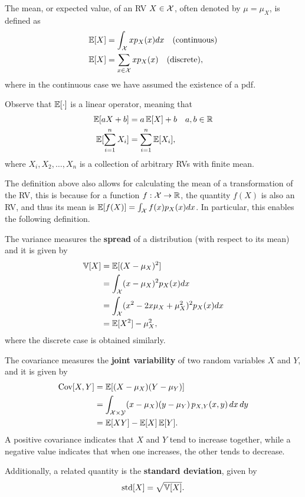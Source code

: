 \begin{definition}[Mean] 
\label{def:mean}
The mean, or expected value, of an RV $X\in{\mathcal X}$, often denoted by $\mu = \mu_X$, is defined as
\begin{align}
	\operatorname{\mathbb{E}}[X] &= \int_{\mathcal X} xp_X(x)dx\quad\text{(continuous)}\\
	\operatorname{\mathbb{E}}[X] &= \sum_{x\in{\mathcal X}} xp_X(x)\quad\text{(discrete)},\\
\end{align}
 where in the continuous case we have assumed the existence of a pdf. 
\end{definition}
Observe that $\operatorname{\mathbb{E}}[\cdot]$ is a linear operator, meaning that 
 \begin{align}
	\operatorname{\mathbb{E}}[aX + b] &= a\operatorname{\mathbb{E}}[X] + b\quad a,b\in\mathbb{R}\\
	\operatorname{\mathbb{E}}[\sum_{i=1}^n X_i] &= \sum_{i=1}^n \operatorname{\mathbb{E}}[ X_i], \\
\end{align}
where $X_i,X_2,\ldots, X_n$ is a collection of arbitrary RVs with finite mean. 

The definition above also allows for calculating the mean of a transformation of the RV, this is because for a function $f:{\mathcal X} \to \mathbb{R}$, the quantity $f(X)$ is also an RV, and thus its mean is $\operatorname{\mathbb{E}}[f(X)] = \int_{\mathcal X} f(x)p_X(x)dx$. In particular, this enables the following definition.


\begin{definition}[Variance] 
\label{def:variance}
The variance measures the \textbf{spread} of a distribution (with respect to its mean) and it is given by
\begin{align}
	\operatorname{\mathbb{V}}[X] &= \operatorname{\mathbb{E}}[(X-\mu_X)^2]\\
				&= \int_{\mathcal X} (x-\mu_X)^2p_X(x)dx\\
				&= \int_{\mathcal X} (x^2 -2x\mu_X+\mu_X^2)^2p_X(x)dx\\
				&= \operatorname{\mathbb{E}}[X^2] -\mu_X^2,
\end{align}
 where the discrete case is obtained similarly. 
\end{definition}

\begin{definition}[Covariance]
\label{def:covariance}
The covariance measures the \textbf{joint variability} of two random variables $X$ and $Y$, and it is given by
\begin{align}
	\operatorname{\text{Cov}}[X,Y] &= \operatorname{\mathbb{E}}\!\left[(X - \mu_X)(Y - \mu_Y)\right]\\
	           &= \int_{{\mathcal X}\times{\mathcal Y}} (x - \mu_X)(y - \mu_Y)\,p_{X,Y}(x,y)\,dx\,dy\\
	           &= \operatorname{\mathbb{E}}[XY] - \operatorname{\mathbb{E}}[X]\operatorname{\mathbb{E}}[Y].
\end{align}
A positive covariance indicates that $X$ and $Y$ tend to increase together, while a negative value indicates that when one increases, the other tends to decrease.
\end{definition}
Additionally, a related quantity is the \textbf{standard deviation}, given by 
\begin{equation}
 	\text{std}[X] = \sqrt{\operatorname{\mathbb{V}}[X]}.
 \end{equation} 

